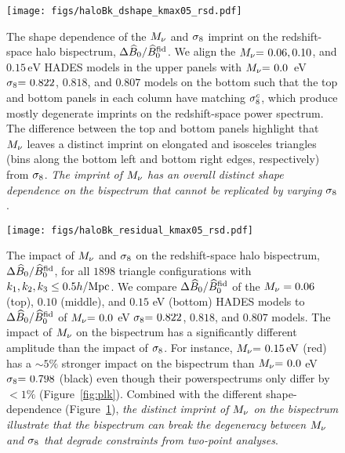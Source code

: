 \begin{figure}
\begin{center}
\texttt{[image: figs/haloBk\_dshape\_kmax05\_rsd.pdf]} 
    \caption{The shape dependence of the $M_\nu$ and $\sigma_8$ imprint on 
    the redshift-space halo bispectrum, $\Delta \widehat{B}_0/\widehat{B}_0^\mathrm{fid}$. 
    We align the $M_\nu{=}~0.06, 0.10$, and $0.15\,\mathrm{eV}$ HADES models 
    in the upper panels with $M_\nu{=}~0.0$~eV $\sigma_8{=}~0.822$, $0.818$, and $0.807$ 
    models on the bottom such that the top and bottom panels in each column 
    have matching $\sigma_8^{c}$, which produce mostly degenerate imprints on the 
    redshift-space power spectrum. The difference between the top and bottom 
    panels highlight that $M_\nu$ leaves a distinct imprint on elongated and 
    isosceles triangles (bins along the bottom left and bottom right edges, 
    respectively) from $\sigma_8$. {\em The imprint of $M_\nu$ has an overall 
    distinct shape dependence on the bispectrum that cannot be replicated by 
    varying $\sigma_8$}. 
    }
\label{fig:dbk_shape}
\end{center}
\end{figure}

\begin{figure}
\begin{center}
\texttt{[image: figs/haloBk\_residual\_kmax05\_rsd.pdf]}
    \caption{The impact of $M_\nu$ and $\sigma_8$ on the redshift-space halo bispectrum,
    $\Delta \widehat{B}_0/\widehat{B}_0^\mathrm{fid}$, for all $1898$ triangle configurations with 
    $k_1, k_2, k_3 \leq 0.5 h/{\rm Mpc}$. We compare $\Delta \widehat{B}_0/\widehat{B}_0^\mathrm{fid}$ 
    of the $M_\nu = 0.06$ (top), $0.10$ (middle), and $0.15$ eV (bottom) HADES models
    to $\Delta \widehat{B}_0/\widehat{B}_0^\mathrm{fid}$ of $M_\nu{=}~0.0$ eV $\sigma_8{=}~0.822$, $0.818$, and 
    $0.807$ models. The impact of $M_\nu$ on the bispectrum has a significantly different 
    amplitude than the impact of $\sigma_8$. For instance, $M_\nu{=}~0.15\,\mathrm{eV}$ (red) 
    has a $\sim 5\%$ stronger impact on the bispectrum than $M_\nu{=}~0.0$ eV  
    $\sigma_8{=}~0.798$ (black) even though their powerspectrums only differ by $< 1\%$ 
    (Figure~\ref{fig:plk}). Combined with the different shape-dependence (Figure~\ref{fig:dbk_shape}), 
    {\em the distinct imprint of $M_\nu$ on the bispectrum illustrate that the bispectrum 
    can break the degeneracy between $M_\nu$ and $\sigma_8$ 
    that degrade constraints from two-point analyses}.
    }
\label{fig:dbk_amp}
\end{center}
\end{figure}
